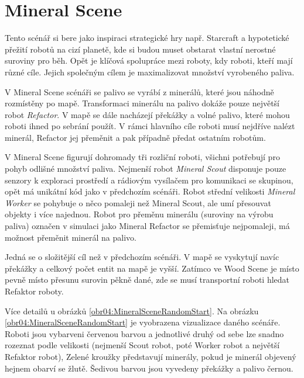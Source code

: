 \section{Mineral Scene}
Tento scénář si bere jako inspiraci strategické hry např. Starcraft \citep*{starcraft} a hypotetické přežití robotů na cizí planetě, kde si budou muset obstarat vlastní nerostné suroviny pro běh. Opět je klíčová spolupráce mezi roboty, kdy roboti, kteří mají různé cíle. Jejich společným cílem je maximalizovat množství vyrobeného paliva.
\par 
V Mineral Scene scénáři se palivo se vyrábí z minerálů, které jsou náhodně rozmístěny po mapě. Transformaci minerálu na palivo dokáže pouze největší robot \textit{Refactor}. V mapě se dále nacházejí překážky a volné palivo, které mohou roboti ihned po sebrání použít. V rámci hlavního cíle roboti musí nejdříve nalézt minerál, Refactor jej přeměnit a pak případně předat ostatním robotům. 
\par
V Mineral Scene figurují dohromady tři rozliční roboti, všichni potřebují pro pohyb odlišné množství paliva. Nejmenší robot \textit{Mineral Scout} disponuje pouze senzory k exploraci prostředí a rádiovým vysílačem pro komunikaci se skupinou, opět má unikátní kód  jako v předchozím scénáři. Robot střední velikosti \textit{Mineral Worker} se pohybuje o něco pomaleji než Mineral Scout, ale umí přesouvat objekty i více najednou. Robot pro přeměnu minerálu (suroviny na výrobu paliva) označen v simulaci jako Mineral Refactor se přemisťuje nejpomaleji, má možnost přeměnit minerál na palivo. 
\par
Jedná se o složitější cíl než v předchozím scénáři. V mapě se vyskytují navíc překážky a celkový počet entit na mapě je vyšší. Zatímco ve Wood Scene je místo pevně místo přesunu surovin pěkně dané, zde se musí transportní roboti hledat Refaktor roboty.
\par 
Více detailů u obrázků \ref{obr04:MineralSceneRandomStart}.
\newpage
Na obrázku \ref{obr04:MineralSceneRandomStart} je vyobrazena vizualizace daného scénáře. Roboti jsou vybarveni červenou barvou a jednotlivé druhý od sebe lze snadno rozeznat podle velikosti (nejmenší Scout robot, poté Worker robot a největší Refaktor robot), Zelené kroužky představují minerály, pokud je minerál objevený hejnem obarví se žlutě. Šedivou barvou jsou vyvedeny překážky a palivo černou.

